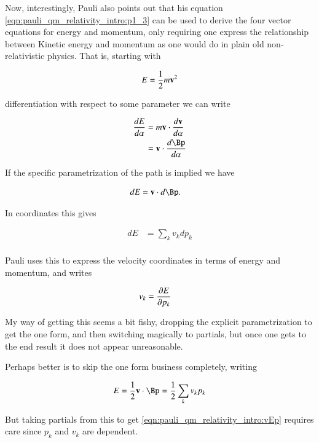 Now, interestingly, Pauli also points out that his equation \ref{eqn:pauli_qm_relativity_intro:p1_3} can be used to derive the four vector
equations for energy and momentum, only requiring one express the relationship between Kinetic energy and momentum
as one would do in plain old non-relativistic physics.  That is, starting with

\begin{align*}
E &= \inv{2} m \Bv^2 \\
\end{align*}

differentiation with respect to some parameter we can write

\begin{align*}
\frac{dE}{d\alpha} 
&= m \Bv \cdot \frac{d\Bv}{d\alpha} \\
&= \Bv \cdot \frac{d\Bp}{d\alpha} \\
\end{align*}

If the specific parametrization of the path is implied we have

\begin{align}\label{eqn:pauli_qm_relativity_intro:EvP}
{dE} &= \Bv \cdot {d\Bp}.
\end{align}

In coordinates this gives

\begin{align*}
{dE} &= \sum_k v_k dp_k \\
\end{align*}

Pauli uses this to express the velocity coordinates in terms of energy and momentum, and writes

\begin{align}\label{eqn:pauli_qm_relativity_intro:vEp}
v_k &= \PD{p_k}{E}
\end{align}

My way of getting this seems a bit fishy, dropping the explicit parametrization to get the one form, and then switching magically to partials, but once one gets to the end result it does not appear unreasonable.

Perhaps better is to skip the one form business completely, writing

\begin{align*}
E = \inv{2} \Bv \cdot \Bp = \inv{2} \sum_k v_k p_k
\end{align*}

But taking partials from this to get \ref{eqn:pauli_qm_relativity_intro:vEp} requires care since $p_k$ and $v_k$ are dependent.

